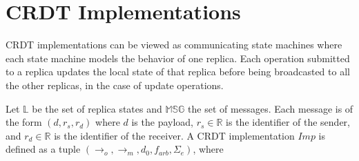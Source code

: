 
\section{CRDT Implementations}
\label{sec:implementation}

CRDT implementations can be viewed as communicating state machines where each state machine models the behavior of one replica. Each operation submitted to a replica updates the local state of that replica before being broadcasted to all the other replicas, in the case of update operations.

Let $\mathbb{L}$ be the set of replica states and $\mathbb{MSG}$ the set of messages. Each message is of the form $(d,r_s,r_d)$ where $d$ is the payload, $r_s \in \mathbb{R}$ is the identifier of the sender, and $r_d \in \mathbb{R}$ is the identifier of the receiver. A CRDT implementation $\mathit{Imp}$ is defined as a tuple $(\rightarrow_o,\rightarrow_m,d_0,f_{\mathit{arb}}, \Sigma_e)$, where

